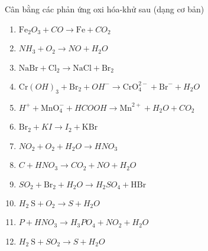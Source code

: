 \begin{bt}
	Cân bằng các phản ứng oxi hóa-khử sau (dạng cơ bản)
	\begin{enumerate}[(1)]
		\item $\mathrm{Fe}_2O_3+CO \longrightarrow \mathrm{Fe}+CO_2$
		\item $NH_3+O_2\longrightarrow NO+H_2O$
		\item $\mathrm{NaBr}+\mathrm{Cl}_2\longrightarrow \mathrm{NaCl}+\mathrm{Br}_2$
		\item $\mathrm{Cr}(OH)_3+\mathrm{Br}_2+OH^{-} \longrightarrow \mathrm{CrO}_4^{2-}+\mathrm{Br}^{-}+H_2O$
		\item $H^{+}+\mathrm{MnO}_4^{-}+HCOOH \longrightarrow \mathrm{Mn}^{2+}+H_2O+CO_2$
		\item $\mathrm{Br}_2+KI \longrightarrow I_2+\mathrm{KBr}$
		\item $NO_2+O_2+H_2O\longrightarrow HNO_3$
		\item $C+HNO_3\longrightarrow CO_2+NO+H_2O$
		\item $SO_2+\mathrm{Br}_2+H_2O\longrightarrow H_2SO_4+\mathrm{HBr}$
		\item $H_2\mathrm{~S}+O_2\longrightarrow S+H_2O$
		\item $P+HNO_3\longrightarrow H_3PO_4+NO_2+H_2O$
		\item $H_2\mathrm{~S}+SO_2\longrightarrow S+H_2O$
	\end{enumerate}
\end{bt}

